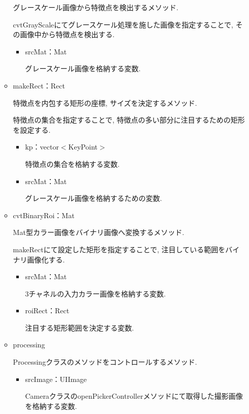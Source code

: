 \begin{itemize}
\begin{itemize}
グレースケール画像から特徴点を検出するメソッド.

cvtGrayScaleにてグレースケール処理を施した画像を指定することで, その画像中から特徴点を検出する.

\begin{itemize}
\item srcMat：Mat

グレースケール画像を格納する変数.
\end{itemize}

\item makeRect：Rect

特徴点を内包する矩形の座標, サイズを決定するメソッド.

特徴点の集合を指定することで, 特徴点の多い部分に注目するための矩形を設定する.

\begin{itemize}
\item kp：vector$<$KeyPoint$>$

特徴点の集合を格納する変数.

\item srcMat：Mat

グレースケール画像を格納するための変数.
\end{itemize}

\item cvtBinaryRoi：Mat

Mat型カラー画像をバイナリ画像へ変換するメソッド.

makeRectにて設定した矩形を指定することで, 注目している範囲をバイナリ画像化する.

\begin{itemize}
\item srcMat：Mat

3チャネルの入力カラー画像を格納する変数.

\item roiRect：Rect

注目する矩形範囲を決定する変数.
\end{itemize}

\item processing

Processingクラスのメソッドをコントロールするメソッド.

\begin{itemize}
\item srcImage：UIImage

CameraクラスのopenPickerControllerメソッドにて取得した撮影画像を格納する変数.
\end{itemize}

\end{itemize}

\end{itemize}

